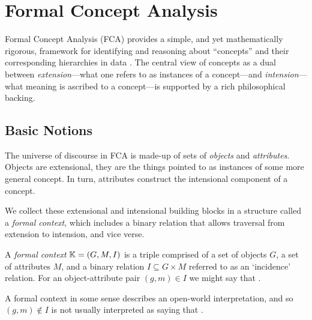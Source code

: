 \chapter{Formal Concept Analysis}
\label{chapter:formal-concept-analysis}

Formal Concept Analysis (FCA) provides a simple, and yet mathematically rigorous, framework for identifying and reasoning about ``concepts'' and their corresponding hierarchies in data \cite{ganter1999formal,ganter2016conceptual}. The central view of concepts as a dual between \textit{extension}---what one refers to as instances of a concept---and \textit{intension}---what meaning is ascribed to a concept---is supported by a rich philosophical backing.   

\section{Basic Notions}
\label{section:basic-notions}
The universe of discourse in FCA is made-up of sets of \textit{objects} and \textit{attributes}. Objects are extensional, they are the things pointed to as instances of some more general concept. In turn, attributes construct the intensional component of a concept.

We collect these extensional and intensional building blocks in a structure called a \textit{formal context}, which includes a binary relation that allows traversal from extension to intension, and vice verse.

\begin{definition}
  \label{definition:formal-context}
  A \textit{formal context} $\mathbb{K} = (G,M,I)$ is a triple comprised of a set of objects $G$, a set of attributes $M$, and a binary relation $I \subseteq G \times M$ referred to as an `incidence' relation. For an object-attribute pair $(g,m) \in I$ we might say that .
\end{definition}

A formal context  in some sense describes an open-world interpretation, and so $(g,m) \not \in I$ is not usually interpreted as saying that .

